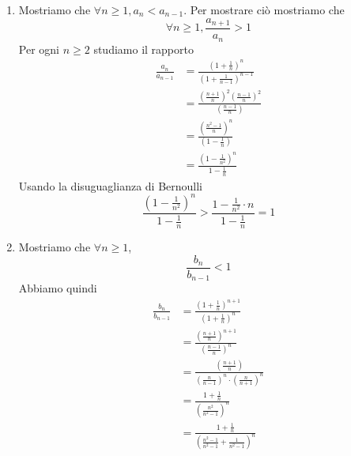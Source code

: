 \documentclass[a4paper]{article}
\begin{document}
\begin{snippetproof}{}
    \begin{enumerate}
        \item Mostriamo che \(\forall n \geq 1, a_n < a_{n-1}\).
        Per mostrare ciò mostriamo che
        \[
            \forall n \geq 1, \frac{a_{n+1}}{a_n} > 1
        \]
        Per ogni \(n \geq 2\) studiamo il rapporto
        \begin{align*}
            \frac{a_n}{a_{n-1}} &= \frac{{\left(1+\frac{1}{n}\right)}^n}{{\left(1+\frac{1}{n-1}\right)}^{n-1}} \\
            &= \frac{ {\left(\frac{n+1}{n}\right)}^2 {\left(\frac{n-1}{n}\right)}^2 }{ \left(\frac{n-1}{n}\right) } \\
            &= \frac{
                {\left(\frac{n^2-1}{n}\right)}^n
            }{
                {\left(1 - \frac{1}{n}\right)}
            } \\
            &=\frac{
                {\left(1 - \frac{1}{n^2}\right)}^n
            }{
                1 - \frac{1}{n}
            }
        \end{align*}
        Usando la disuguaglianza di Bernoulli
        \[
            \frac{
                {\left(1 - \frac{1}{n^2}\right)}^n
            }{
                1 - \frac{1}{n}
            } > \frac{
                1-\frac{1}{n^2} \cdot n
            }{
                1 - \frac{1}{n}
            } = 1
        \]
        \item Mostriamo che \(\forall n \geq 1\),
        \[
            \frac{b_n}{b_{n-1}} < 1
        \]
        Abbiamo quindi
        \begin{align*}
            \frac{b_n}{b_{n-1}} &= \frac{
                {\left(1 + \frac{1}{n}\right)}^{n+1}
            }{
                {\left(1 + \frac{1}{n}\right)}^n
            } \\
            &= \frac{
                {\left(\frac{n+1}{n}\right)}^{n+1}
            }{
                {\left(\frac{n-1}{n}\right)}^n
            } \\
            &= \frac{
                {\left(\frac{n+1}{n}\right)}
            }{
                {\left(\frac{n}{n-1}\right)}^n \cdot {\left(\frac{n}{n+1}\right)}^n
            } \\
            &= \frac{
                1 + \frac{1}{n}
            }{
                {\left(\frac{n^2}{n^2-1}\right)}^n
            } \\
            &= \frac{1 + \frac{1}{n}}{
                {\left(\frac{n^2 - 1}{n^2-1} + \frac{1}{n^2-1}\right)}^n
}
\end{align*}
\end{enumerate}
\end{snippetproof}
\end{document}
